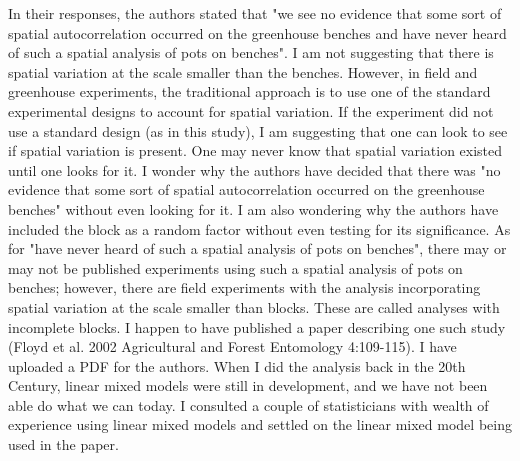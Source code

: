 \documentclass[parskip=half]{scrartcl}
\begin{document}
In their responses, the authors stated that "we see no evidence that some sort of spatial autocorrelation occurred on the greenhouse benches and have never heard of such a spatial analysis of pots on benches".
I am not suggesting that there is spatial variation at the scale smaller than the benches.  
However, in field and greenhouse experiments, the traditional approach is to use one of the standard experimental designs to account for spatial variation.  
If the experiment did not use a standard design (as in this study), I am suggesting that one can look to see if spatial variation is present.  
One may never know that spatial variation existed until one looks for it. 
I wonder why the authors have decided that there was "no evidence that some sort of spatial autocorrelation occurred on the greenhouse benches" without even looking for it.
I am also wondering why the authors have included the block as a random factor without even testing for its significance.
As for "have never heard of such a spatial analysis of pots on benches", there may or may not be published experiments using such a spatial analysis of pots on benches; however, there are field experiments with the analysis incorporating spatial variation at the scale smaller than blocks.  These are called analyses with incomplete blocks. I happen to have published a paper describing one such study (Floyd et al. 2002 Agricultural and Forest Entomology 4:109-115).  I have uploaded a PDF for the authors.  When I did the analysis back in the 20th Century, linear mixed models were still in development, and we have not been able do what we can today. I consulted a couple of statisticians with wealth of experience using linear mixed models and settled on the linear mixed model being used in the paper.
\end{document}
